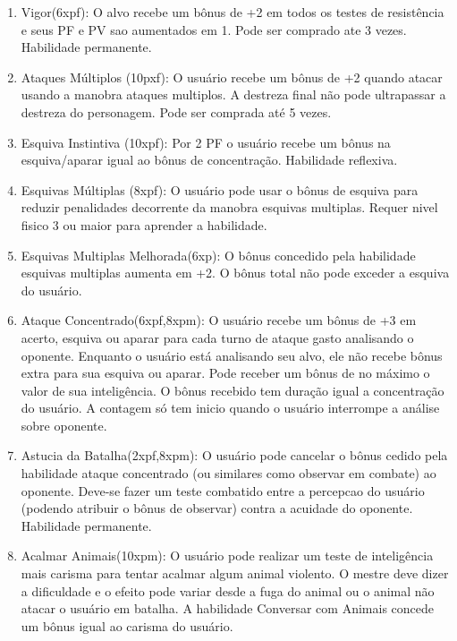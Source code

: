 \begin{enumerate}
	
	\item Vigor(6xpf): O alvo recebe um bônus de +2 em todos os testes de resistência e seus PF e PV sao aumentados em 1. Pode ser comprado ate 3 vezes. Habilidade permanente.

	\item Ataques Múltiplos (10pxf): O usuário recebe um bônus de +2 quando atacar usando a manobra ataques multiplos. A destreza final não pode ultrapassar a destreza do personagem. Pode ser comprada até 5 vezes.

	\item Esquiva Instintiva (10xpf): Por 2 PF o usuário recebe um bônus na esquiva/aparar igual ao bônus de concentração. Habilidade reflexiva.
	
	\item Esquivas Múltiplas (8xpf): O usuário pode usar o bônus de esquiva para reduzir penalidades decorrente da manobra esquivas multiplas. Requer nivel fisico 3 ou maior para aprender a habilidade.	

	\item Esquivas Multiplas Melhorada(6xp): O bônus concedido pela habilidade esquivas multiplas aumenta em +2. O bônus total não pode exceder a esquiva do usuário.

	\item Ataque Concentrado(6xpf,8xpm): O usuário recebe um bônus de +3 em acerto, esquiva ou aparar para cada turno de ataque gasto analisando o oponente. Enquanto o usuário está analisando seu alvo, ele não recebe bônus extra para sua esquiva ou aparar. Pode receber um bônus de no máximo o valor de sua inteligência. O bônus recebido tem duração igual a concentração do usuário. A contagem só tem inicio quando o usuário interrompe a análise sobre oponente.

	\item Astucia da Batalha(2xpf,8xpm): O usuário pode cancelar o bônus cedido pela habilidade ataque concentrado (ou similares como observar em combate) ao oponente. Deve-se fazer um teste combatido entre a percepcao do usuário (podendo atribuir o bônus de observar) contra a acuidade do oponente. Habilidade permanente.
	
  \item Acalmar Animais(10xpm): O usuário pode realizar um teste de inteligência mais carisma para tentar acalmar algum animal violento. O mestre deve dizer a dificuldade e o efeito pode variar desde a fuga do animal ou o animal não atacar o usuário em batalha. A habilidade Conversar com Animais concede um bônus igual ao carisma do usuário.


\end{enumerate}
